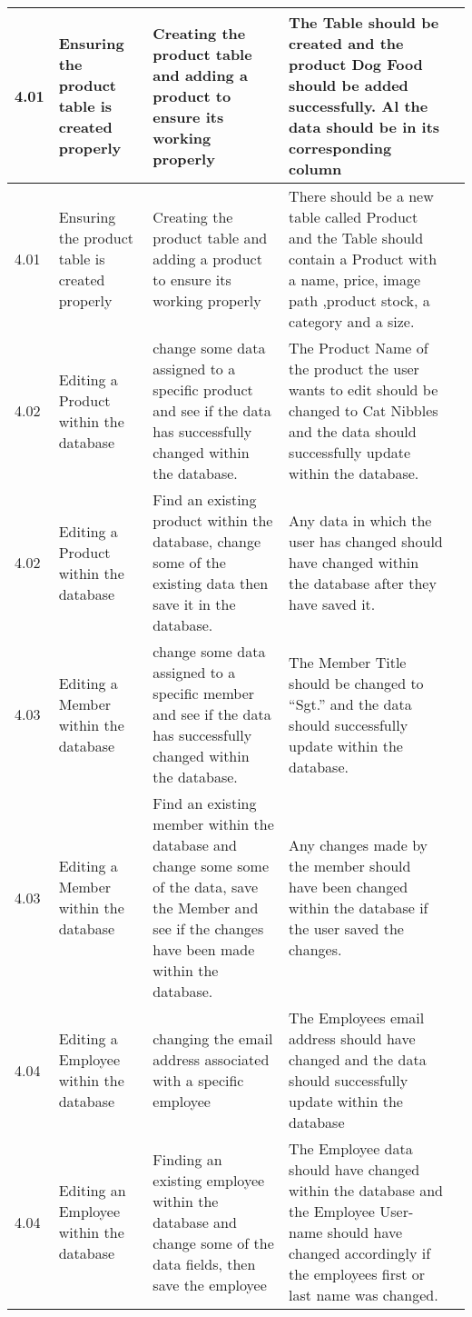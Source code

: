 \begin{flushleft}
\begin{longtable}{|p{1cm}|p{2.5cm}|p{2.5cm}|p{2cm}|p{2cm}|}
	\rowcolor{dark-grey}4.01 & Ensuring the product table is created properly & Creating the product table and adding a product to ensure its working properly & The Table should be created and the product Dog Food should be added successfully. Al the data should be in its corresponding column & \\ \hline
	\rowcolor{light-grey}4.01 & Ensuring the product table is created properly & Creating the product table and adding a product to ensure its working properly & There should be a new table called Product and the Table should contain a Product with a name, price, image path ,product stock, a category and a size.& \\ \hline
	\rowcolor{dark-grey}4.02 & Editing a Product within the database &  change some data assigned to a specific product and see if the data has successfully changed within the database. & The Product Name of the product the user wants to edit should be changed to Cat Nibbles and the data should successfully update within the database. & \\ \hline
	\rowcolor{light-grey}4.02 & Editing a Product within the database & Find an existing product within the database, change some of the existing data then save it in the database. & Any data in which the user has changed should have changed within the database after they have saved it. & \\ \hline
	\rowcolor{dark-grey}4.03 & Editing a Member within the database &  change some data assigned to a specific member and see if the data has successfully changed within the database. &  The Member Title should be changed to ``Sgt.'' and the data should successfully update within the database.  & \\ \hline
	\rowcolor{light-grey}4.03 & Editing a Member within the database & Find an existing member within the database and change some some of the data, save the Member and see if the changes have been made within the database. &  Any changes made by the member should have been changed within the database if the user saved the changes.& \\ \hline
	\rowcolor{dark-grey}4.04 & Editing a Employee within the database &  changing the email address associated with a specific employee & The Employees email address should have changed and the data should successfully update within the database& \\ \hline
	\rowcolor{light-grey}4.04 & Editing an Employee within the database &  Finding an existing employee within the database and change some of the data fields, then save the employee & The Employee data should have changed within the database and the Employee User-name should have changed accordingly if the employees first or last name was changed.&  \\ \hline

\end{longtable}
\end{flushleft}
